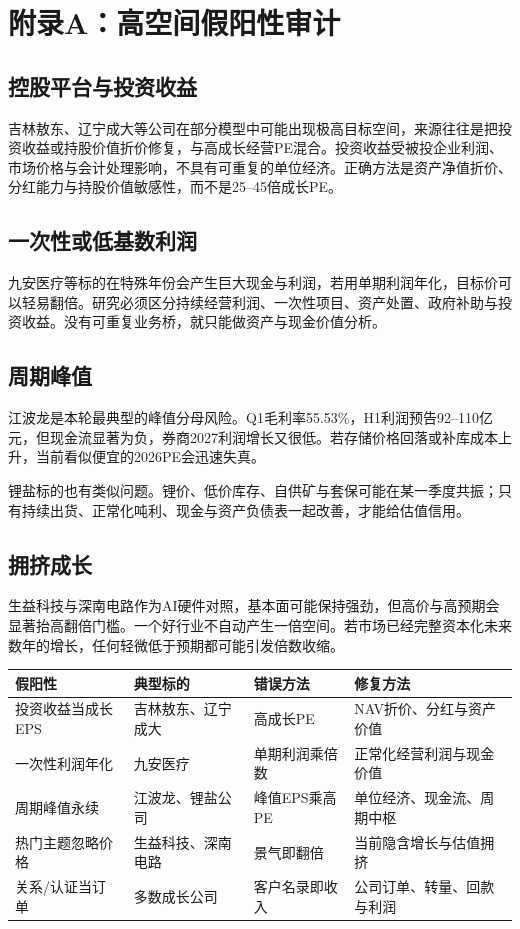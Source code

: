 \chapter{附录A：高空间假阳性审计}

\section{控股平台与投资收益}

吉林敖东、辽宁成大等公司在部分模型中可能出现极高目标空间，来源往往是把投资收益或持股价值折价修复，与高成长经营PE混合。投资收益受被投企业利润、市场价格与会计处理影响，不具有可重复的单位经济。正确方法是资产净值折价、分红能力与持股价值敏感性，而不是25--45倍成长PE。

\section{一次性或低基数利润}

九安医疗等标的在特殊年份会产生巨大现金与利润，若用单期利润年化，目标价可以轻易翻倍。研究必须区分持续经营利润、一次性项目、资产处置、政府补助与投资收益。没有可重复业务桥，就只能做资产与现金价值分析。

\section{周期峰值}

江波龙是本轮最典型的峰值分母风险。Q1毛利率55.53\%，H1利润预告92--110亿元，但现金流显著为负，券商2027利润增长又很低。若存储价格回落或补库成本上升，当前看似便宜的2026PE会迅速失真。

锂盐标的也有类似问题。锂价、低价库存、自供矿与套保可能在某一季度共振；只有持续出货、正常化吨利、现金与资产负债表一起改善，才能给估值信用。

\section{拥挤成长}

生益科技与深南电路作为AI硬件对照，基本面可能保持强劲，但高价与高预期会显著抬高翻倍门槛。一个好行业不自动产生一倍空间。若市场已经完整资本化未来数年的增长，任何轻微低于预期都可能引发倍数收缩。

\begin{exhibitbox}
\small
\begin{tabularx}{\exhibitboxwidth}{L{3cm} L{3cm} X X}
\toprule
假阳性 & 典型标的 & 错误方法 & 修复方法 \\
\midrule
投资收益当成长EPS & 吉林敖东、辽宁成大 & 高成长PE & NAV折价、分红与资产价值 \\
一次性利润年化 & 九安医疗 & 单期利润乘倍数 & 正常化经营利润与现金价值 \\
周期峰值永续 & 江波龙、锂盐公司 & 峰值EPS乘高PE & 单位经济、现金流、周期中枢 \\
热门主题忽略价格 & 生益科技、深南电路 & 景气即翻倍 & 当前隐含增长与估值拥挤 \\
关系/认证当订单 & 多数成长公司 & 客户名录即收入 & 公司订单、转量、回款与利润 \\
\bottomrule
\end{tabularx}
\end{exhibitbox}

\clearpage
